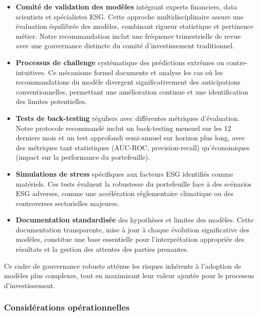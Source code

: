\begin{itemize}
    \item \textbf{Comité de validation des modèles} intégrant experts financiers, data scientists et spécialistes ESG. Cette approche multidisciplinaire assure une évaluation équilibrée des modèles, combinant rigueur statistique et pertinence métier. Notre recommandation inclut une fréquence trimestrielle de revue avec une gouvernance distincte du comité d'investissement traditionnel.
    
    \item \textbf{Processus de challenge} systématique des prédictions extrêmes ou contre-intuitives. Ce mécanisme formel documente et analyse les cas où les recommandations du modèle divergent significativement des anticipations conventionnelles, permettant une amélioration continue et une identification des limites potentielles.
    
    \item \textbf{Tests de back-testing} réguliers avec différentes métriques d'évaluation. Notre protocole recommandé inclut un back-testing mensuel sur les 12 derniers mois et un test approfondi semi-annuel sur horizon plus long, avec des métriques tant statistiques (AUC-ROC, precision-recall) qu'économiques (impact sur la performance du portefeuille).
    
    \item \textbf{Simulations de stress} spécifiques aux facteurs ESG identifiés comme matériels. Ces tests évaluent la robustesse du portefeuille face à des scénarios ESG adverses, comme une accélération réglementaire climatique ou des controverses sectorielles majeures.
    
    \item \textbf{Documentation standardisée} des hypothèses et limites des modèles. Cette documentation transparente, mise à jour à chaque évolution significative des modèles, constitue une base essentielle pour l'interprétation appropriée des résultats et la gestion des attentes des parties prenantes.
\end{itemize}

Ce cadre de gouvernance robuste atténue les risques inhérents à l'adoption de modèles plus complexes, tout en maximisant leur valeur ajoutée pour le processus d'investissement.

\subsubsection{Considérations opérationnelles}

